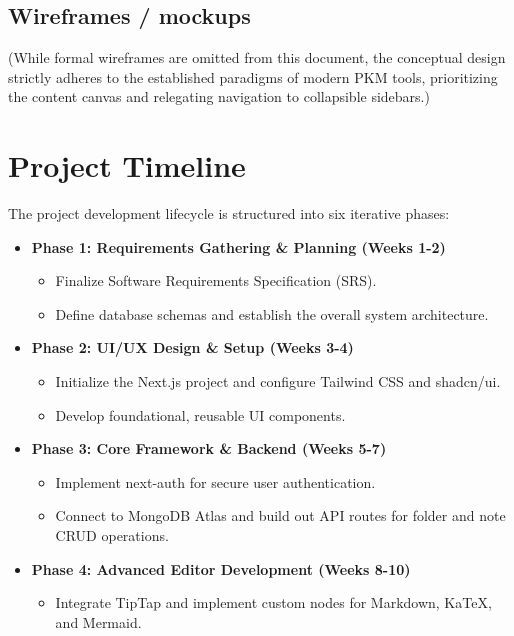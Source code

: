 \documentclass[12pt, a4paper]{article}
\begin{document}
\subsection{Wireframes / mockups}
(While formal wireframes are omitted from this document, the conceptual design strictly adheres to the established paradigms of modern PKM tools, prioritizing the content canvas and relegating navigation to collapsible sidebars.)

\section{Project Timeline}

The project development lifecycle is structured into six iterative phases:

\begin{itemize}[leftmargin=2em]
    \item \textbf{Phase 1: Requirements Gathering \& Planning (Weeks 1-2)}
        \begin{itemize}
            \item Finalize Software Requirements Specification (SRS).
            \item Define database schemas and establish the overall system architecture.
        \end{itemize}
    \item \textbf{Phase 2: UI/UX Design \& Setup (Weeks 3-4)}
        \begin{itemize}
            \item Initialize the Next.js project and configure Tailwind CSS and shadcn/ui.
            \item Develop foundational, reusable UI components.
        \end{itemize}
    \item \textbf{Phase 3: Core Framework \& Backend (Weeks 5-7)}
        \begin{itemize}
            \item Implement next-auth for secure user authentication.
            \item Connect to MongoDB Atlas and build out API routes for folder and note CRUD operations.
        \end{itemize}
    \item \textbf{Phase 4: Advanced Editor Development (Weeks 8-10)}
        \begin{itemize}
            \item Integrate TipTap and implement custom nodes for Markdown, KaTeX, and Mermaid.

\end{itemize}
\end{itemize}
\end{document}
